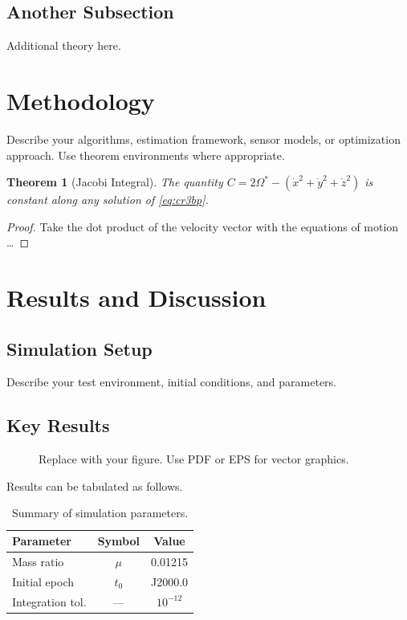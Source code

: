 \documentclass[11pt, letterpaper]{article}
\newtheorem{theorem}{Theorem}[section]
\begin{document}
\subsection{Another Subsection}

Additional theory here.

\section{Methodology}
\label{sec:method}

Describe your algorithms, estimation framework, sensor models, or optimization approach.
Use theorem environments where appropriate.

\begin{theorem}[Jacobi Integral]
\label{thm:jacobi}
The quantity $C = 2\Omega^* - (\dot{x}^2 + \dot{y}^2 + \dot{z}^2)$ is constant along
any solution of \eqref{eq:cr3bp}.
\end{theorem}

\begin{proof}
Take the dot product of the velocity vector with the equations of motion \ldots
\end{proof}

\section{Results and Discussion}
\label{sec:results}

\subsection{Simulation Setup}

Describe your test environment, initial conditions, and parameters.

\subsection{Key Results}

\begin{figure}[H]
    \centering
    \caption{Replace with your figure. Use PDF or EPS for vector graphics.}
    \label{fig:result1}
\end{figure}

Results can be tabulated as follows.

\begin{table}[H]
    \centering
    \caption{Summary of simulation parameters.}
    \label{tab:params}
    \begin{tabular}{lcc}
        \toprule
        \textbf{Parameter} & \textbf{Symbol} & \textbf{Value} \\
        \midrule
        Mass ratio         & $\mu$           & 0.01215 \\
        Initial epoch      & $t_0$           & J2000.0 \\
        Integration tol.   & ---             & $10^{-12}$ \\
        \bottomrule
    \end{tabular}
\end{table}
\end{document}
